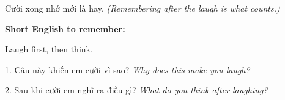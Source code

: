 \begin{baihoc}
Cười xong nhớ mới là hay.
\textit{(Remembering after the laugh is what counts.)}
\end{baihoc}

\begin{ghinhoanh}
\textbf{Short English to remember:}

Laugh first, then think.

\end{ghinhoanh}

\begin{tuhocnhanh}
1. Câu này khiến em cười vì sao? \textit{Why does this make you laugh?}

2. Sau khi cười em nghĩ ra điều gì? \textit{What do you think after laughing?}
\end{tuhocnhanh}
\ngancach
